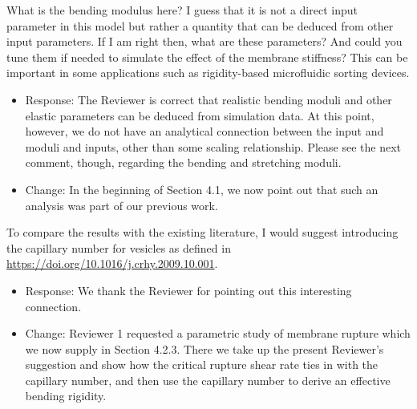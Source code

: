\documentclass[11pt]{article}
\newcommand{\comment}[1]{{\color{blue} #1}}
\begin{document}
\noindent
\comment{What is the bending modulus here? I guess that it is not a
direct input parameter in this model but rather a quantity that can be
deduced from other input parameters. If I am right then, what are these
parameters? And could you tune them if needed to simulate the effect of
the membrane stiffness? This can be important in some applications such
as rigidity-based microfluidic sorting devices.}
\begin{itemize}
\item Response: The Reviewer is correct that realistic bending moduli
  and other elastic parameters can be deduced from simulation data.
  At this point, however, we do not have an analytical connection between
  the input and moduli and inputs, other than some scaling relationship.
  Please see the next comment, though, regarding the bending and stretching
  moduli.
\item Change: In the beginning of Section 4.1,
  we now point out that such an analysis was part of our previous work.  
\end{itemize}

\noindent
\comment{To compare the results with the existing literature, I would
suggest introducing the capillary number for vesicles as defined in
\url{https://doi.org/10.1016/j.crhy.2009.10.001}.}
\begin{itemize}
\item Response:  We thank the Reviewer for pointing out this interesting connection. 
\item Change:  Reviewer 1 requested a parametric study of membrane rupture which
  we now supply in Section 4.2.3. There we take up the present Reviewer's
  suggestion and show how the critical rupture shear rate ties in with the capillary
  number, and then use the capillary number to derive an effective bending rigidity. 
\end{itemize}
\end{document}
